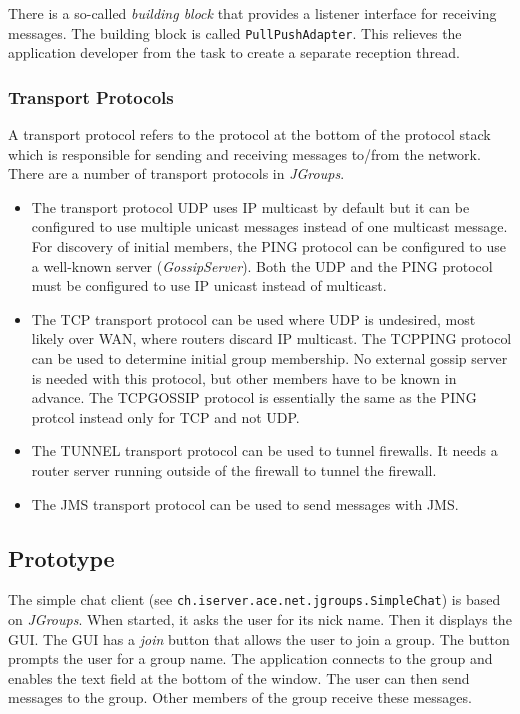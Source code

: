 There is a so-called \emph{building block} that provides a listener interface for receiving messages. The building block is called \texttt{PullPushAdapter}. This relieves the application developer from the task to create a separate reception thread. 

\subsubsection{Transport Protocols}
A transport protocol refers to the protocol at the bottom of the protocol stack which is responsible for sending and receiving messages to/from the network. There are a number of transport protocols in \emph{JGroups}.
\begin{itemize}
 \item The transport protocol UDP uses IP multicast by default but it can be configured to use multiple unicast messages instead of one multicast message. For discovery of initial members, the PING protocol can be configured to use a well-known server (\emph{GossipServer}). Both the UDP and the PING protocol must be configured to use IP unicast instead of multicast.
 \item The TCP transport protocol can be used where UDP is undesired, most likely over WAN, where routers discard IP multicast. The TCPPING protocol can be used to determine initial group membership. No external gossip server is needed with this protocol, but other members have to be known in advance. The TCPGOSSIP protocol is essentially the same as the PING protcol instead only for TCP and not UDP.
 \item The TUNNEL transport protocol can be used to tunnel firewalls. It needs a router server running outside of the firewall to tunnel the firewall.
 \item The JMS transport protocol can be used to send messages with JMS.
\end{itemize}


\subsection{Prototype}
The simple chat client (see \texttt{ch.iserver.ace.net.jgroups.SimpleChat}) is based on \emph{JGroups}. When started, it asks the user for its nick name. Then it displays the GUI. The GUI has a \emph{join} button that allows the user to join a group. The button prompts the user for a group name. The application connects to the group and enables the text field at the bottom of the window. The user can then send messages to the group. Other members of the group receive these messages.

